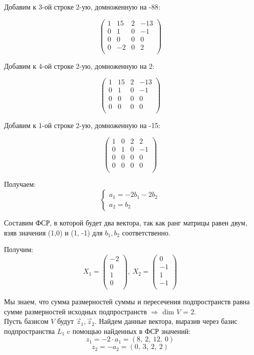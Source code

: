 	Добавим к 3-ой строке 2-ую, домноженную на -88:
	
	\[
	\begin{pmatrix}
	1 & 15 & 2 & -13 \\
	0 & 1 & 0 & -1 \\
	0 & 0 & 0 & 0 \\
	0 & -2 & 0 & 2 \\
	\end{pmatrix}
	\]
	
	Добавим к 4-ой строке 2-ую, домноженную на 2:
	
	\[
	\begin{pmatrix}
	1 & 15 & 2 & -13 \\
	0 & 1 & 0 & -1 \\
	0 & 0 & 0 & 0 \\
	0 & 0 & 0 & 0 \\
	\end{pmatrix}
	\]
	
	Добавим к 1-ой строке 2-ую, домноженную на -15:
	
	\[
	\begin{pmatrix}
	1 & 0 & 2 & 2 \\
	0 & 1 & 0 & -1 \\
	0 & 0 & 0 & 0 \\
	0 & 0 & 0 & 0 \\
	\end{pmatrix}
	\]
	
	Получаем:
	\[
	\begin{cases}
	a_1 = -2b_1 -2 b_2 \\
	a_2 = b_2 
	\end{cases}
	\]
	
	Составим ФСР, в которой будет два вектора, так как ранг матрицы равен двум, взяв значения (1,0) и (1, -1) для $b_1, b_2$ соответственно. 
	
	Получим:
	\[ X_1 = 
	\begin{pmatrix}
    -2 \\
	0  \\
	1 \\
	0 \\
	\end{pmatrix},\ 
	X_2 = 
	\begin{pmatrix}
	0 \\
	-1 \\
	1 \\
	-1 \\
	\end{pmatrix}
	\]
	
	Мы знаем, что сумма размерностей суммы и пересечения подпространств равна сумме размерностей исходных подпространств $\Rightarrow$ dim $V$ = 2.  \\
	Пусть базисом $V$ будут $\vec z_1, \vec z_2$. Найдем данные вектора, выразив через базис подпространства $L_1$ c помощью найденных в ФСР значений: 
	\[
		z_1 = -2 \cdot a_1 = (8,\ 2,\ 12,\ 0) 
	\]
	\[
		z_2 = -a_2 = (0,\ 3,\ 2,\ 2) 
	\]
	
